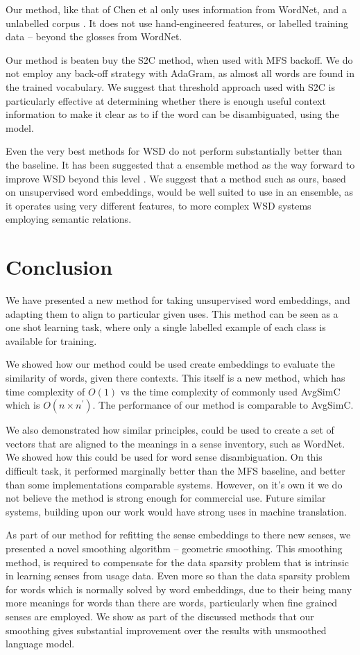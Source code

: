 \documentclass{sig-alternate}
\begin{document}
Our method, like that of Chen et al only uses information from WordNet, and a unlabelled corpus \parencite{Chen2014}. It does not use hand-engineered features, or labelled training data -- beyond the glosses from WordNet. 

Our method is beaten buy the S2C method, when used with MFS backoff.
We do not employ any back-off strategy with AdaGram, as almost all words are found in the trained vocabulary. We suggest that threshold approach used with S2C is particularly effective at determining whether there is enough useful context information to make it clear as to if the word can be disambiguated, using the model.

Even the very best methods for WSD do not perform substantially better than the baseline. It has been suggested that a ensemble method as the way forward to improve WSD beyond this level \cite{saarikoski2006building,saarikoski2006defining}.
We suggest that a method such as ours, based on unsupervised word embeddings, would be well suited to use in an ensemble, as it operates using very different features, to more complex WSD systems employing semantic relations.


\section{Conclusion}

We have presented a new method for taking unsupervised word embeddings, and adapting them to align to particular given uses. This method can be seen as a one shot learning task, where only a single labelled example of each class is available for training.


We showed how our method could be used create embeddings to evaluate the similarity of words, given there contexts. This itself is a new method, which has time complexity of $O(1)$ vs the time complexity of commonly used AvgSimC which is $O(n \times n^\prime)$.
The performance of our method is comparable to AvgSimC.

We also demonstrated how similar principles, could be used to create a set of vectors that are aligned to the meanings in a sense inventory, such as WordNet. We showed how this could be used for word sense disambiguation. On this difficult task, it performed marginally better than the MFS baseline, and better than some implementations comparable systems. However, on it's own it we do not believe the method is strong enough for commercial use. Future similar systems, building upon our work would have strong uses in machine translation.

As part of our method for refitting the sense embeddings to there new senses, we presented a novel smoothing algorithm -- geometric smoothing. 
This smoothing method, is required to compensate for the data sparsity problem that is intrinsic in learning senses from usage data. Even more so than the data sparsity problem for words which is normally solved by word embeddings, due to their being many more meanings for words than there are words, particularly when fine grained senses are employed. We show as part of the discussed methods that our smoothing gives substantial improvement over the results with unsmoothed language model.

\printbibliography
\end{document}
